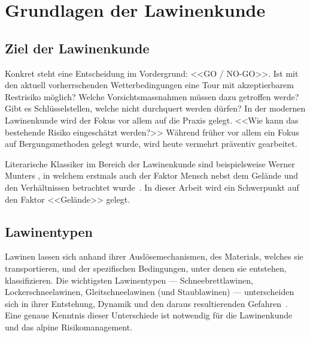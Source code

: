 \clearpage
\section{Grundlagen der Lawinenkunde}
\subsection{Ziel der Lawinenkunde}

Konkret steht eine Entscheidung im Vordergrund: <<GO / NO-GO>>. Ist mit den aktuell vorherrschenden Wetterbedingungen eine Tour mit akzeptierbarem Restrisiko möglich? Welche Vorsichtsmassnahmen müssen dazu getroffen werde? Gibt es Schlüsselstellen, welche nicht durchquert werden dürfen? In der modernen Lawinenkunde wird der Fokus vor allem auf die Praxis gelegt. <<Wie kann das bestehende Risiko eingeschätzt werden?>> Während früher vor allem ein Fokus auf Bergungsmethoden gelegt wurde, wird heute vermehrt präventiv gearbeitet.~\cite{harveyrhynerschweizerlawinenkunde}

Literarische Klassiker im Bereich der Lawinenkunde sind beispielsweise Werner Munters , in welchem erstmals auch der Faktor Mensch nebst dem Gelände und den Verhältnissen betrachtet wurde~\cite{munter}. In dieser Arbeit wird ein Schwerpunkt auf den Faktor <<Gelände>> gelegt.


\subsection{Lawinentypen}

Lawinen lassen sich anhand ihrer Auslösemechanismen, des Materials, welches sie transportieren, und der spezifischen Bedingungen, unter denen sie entstehen, klassifizieren. Die wichtigsten Lawinentypen --- Schneebrettlawinen, Lockerschneelawinen, Gleitschneelawinen (und Staublawinen) --- unterscheiden sich in ihrer Entstehung, Dynamik und den daraus resultierenden Gefahren~\cite{harveyrhynerschweizerlawinenkunde}. Eine genaue Kenntnis dieser Unterschiede ist notwendig für die Lawinenkunde und das alpine Risikomanagement.

